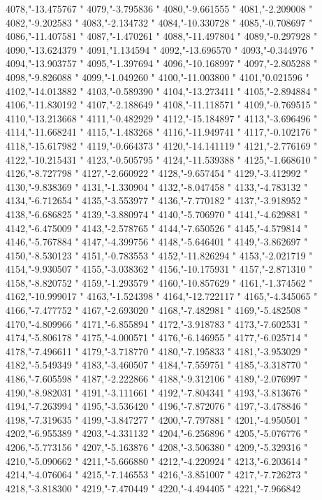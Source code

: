 4078,"-13.475767
"
4079,"-3.795836
"
4080,"-9.661555
"
4081,"-2.209008
"
4082,"-9.202583
"
4083,"-2.134732
"
4084,"-10.330728
"
4085,"-0.708697
"
4086,"-11.407581
"
4087,"-1.470261
"
4088,"-11.497804
"
4089,"-0.297928
"
4090,"-13.624379
"
4091,"1.134594
"
4092,"-13.696570
"
4093,"-0.344976
"
4094,"-13.903757
"
4095,"-1.397694
"
4096,"-10.168997
"
4097,"-2.805288
"
4098,"-9.826088
"
4099,"-1.049260
"
4100,"-11.003800
"
4101,"0.021596
"
4102,"-14.013882
"
4103,"-0.589390
"
4104,"-13.273411
"
4105,"-2.894884
"
4106,"-11.830192
"
4107,"-2.188649
"
4108,"-11.118571
"
4109,"-0.769515
"
4110,"-13.213668
"
4111,"-0.482929
"
4112,"-15.184897
"
4113,"-3.696496
"
4114,"-11.668241
"
4115,"-1.483268
"
4116,"-11.949741
"
4117,"-0.102176
"
4118,"-15.617982
"
4119,"-0.664373
"
4120,"-14.141119
"
4121,"-2.776169
"
4122,"-10.215431
"
4123,"-0.505795
"
4124,"-11.539388
"
4125,"-1.668610
"
4126,"-8.727798
"
4127,"-2.660922
"
4128,"-9.657454
"
4129,"-3.412992
"
4130,"-9.838369
"
4131,"-1.330904
"
4132,"-8.047458
"
4133,"-4.783132
"
4134,"-6.712654
"
4135,"-3.553977
"
4136,"-7.770182
"
4137,"-3.918952
"
4138,"-6.686825
"
4139,"-3.880974
"
4140,"-5.706970
"
4141,"-4.629881
"
4142,"-6.475009
"
4143,"-2.578765
"
4144,"-7.650526
"
4145,"-4.579814
"
4146,"-5.767884
"
4147,"-4.399756
"
4148,"-5.646401
"
4149,"-3.862697
"
4150,"-8.530123
"
4151,"-0.783553
"
4152,"-11.826294
"
4153,"-2.021719
"
4154,"-9.930507
"
4155,"-3.038362
"
4156,"-10.175931
"
4157,"-2.871310
"
4158,"-8.820752
"
4159,"-1.293579
"
4160,"-10.857629
"
4161,"-1.374562
"
4162,"-10.999017
"
4163,"-1.524398
"
4164,"-12.722117
"
4165,"-4.345065
"
4166,"-7.477752
"
4167,"-2.693020
"
4168,"-7.482981
"
4169,"-5.482508
"
4170,"-4.809966
"
4171,"-6.855894
"
4172,"-3.918783
"
4173,"-7.602531
"
4174,"-5.806178
"
4175,"-4.000571
"
4176,"-6.146955
"
4177,"-6.025714
"
4178,"-7.496611
"
4179,"-3.718770
"
4180,"-7.195833
"
4181,"-3.953029
"
4182,"-5.549349
"
4183,"-3.460507
"
4184,"-7.559751
"
4185,"-3.318770
"
4186,"-7.605598
"
4187,"-2.222866
"
4188,"-9.312106
"
4189,"-2.076997
"
4190,"-8.982031
"
4191,"-3.111661
"
4192,"-7.804341
"
4193,"-3.813676
"
4194,"-7.263994
"
4195,"-3.536420
"
4196,"-7.872076
"
4197,"-3.478846
"
4198,"-7.319635
"
4199,"-3.847277
"
4200,"-7.797881
"
4201,"-4.950501
"
4202,"-6.955389
"
4203,"-4.331132
"
4204,"-6.256896
"
4205,"-5.076776
"
4206,"-5.773156
"
4207,"-5.163876
"
4208,"-3.506380
"
4209,"-5.329316
"
4210,"-5.090662
"
4211,"-5.666880
"
4212,"-4.220924
"
4213,"-6.203614
"
4214,"-4.076064
"
4215,"-7.146553
"
4216,"-3.851007
"
4217,"-7.726273
"
4218,"-3.818300
"
4219,"-7.470449
"
4220,"-4.494405
"
4221,"-7.966842
